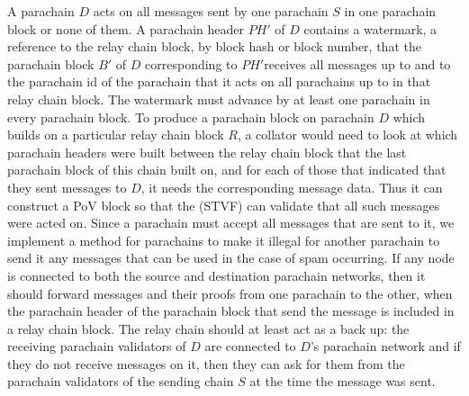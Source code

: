 A parachain $D$ acts on all messages sent by one parachain $S$ in one parachain block or none of them. A parachain header $PH'$ of $D$ contains a watermark, a reference to the relay chain block, by block hash or block number, that the parachain block $B'$ of $D$ corresponding to $PH'$receives all messages up to and to the parachain id of the parachain that it acts on all parachains up to in that relay chain block.
The watermark must advance by at least one parachain in every parachain block. To produce a parachain block on parachain $D$ which builds on a particular relay chain block $R$,
a collator would need to look at which parachain headers were built between the relay chain block that the last parachain block of this chain built on,
and for each of those that indicated that they sent messages to $D$, it needs the corresponding message data.
Thus it can construct a PoV block so that the (STVF) can validate that all such messages were acted on. Since a parachain must accept all messages that are sent to it,
we implement a method for parachains to make it illegal for another parachain to send it any messages that can be used in the case of spam occurring. If any node is connected to both the source and destination parachain networks, then it should forward messages and their proofs from one parachain to the other,
when the parachain header of the parachain block that send the message is included in a relay chain block. The relay chain should at least act as a back up: the receiving parachain validators  of $D$ are connected to $D$'s parachain network and if they do not receive messages on it, then they can ask for them from the parachain validators of the sending chain $S$ at the time the message was sent.


